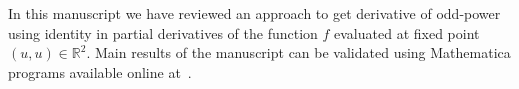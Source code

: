 In this manuscript we have reviewed an approach to get derivative of odd-power using identity in partial derivatives
of the function $f$ evaluated at fixed point $(u,u) \in \mathbb{R}^2.$
Main results of the manuscript can be validated using Mathematica programs available online at~\cite{GithubSource_2022}.